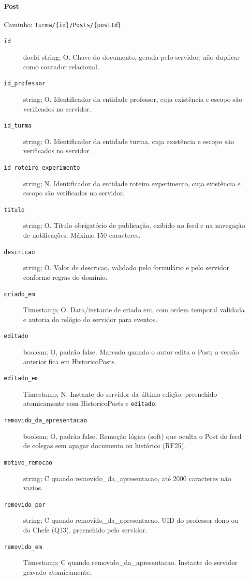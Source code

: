 \paragraph{Post}\mbox{}\par
Caminho: \texttt{Turma/\{id\}/Posts/\{postId\}}.
\begin{description}
\item[\texttt{id}] docId string; O. Chave do documento, gerada pelo servidor; não duplicar como contador relacional.
\item[\texttt{id\_professor}] string; O. Identificador da entidade professor, cuja existência e escopo são verificados no servidor.
\item[\texttt{id\_turma}] string; O. Identificador da entidade turma, cuja existência e escopo são verificados no servidor.
\item[\texttt{id\_roteiro\_experimento}] string; N. Identificador da entidade roteiro experimento, cuja existência e escopo são verificados no servidor.
\item[\texttt{titulo}] string; O. Título obrigatório de publicação, exibido no feed e na navegação de notificações. Máximo 150 caracteres.
\item[\texttt{descricao}] string; O. Valor de descricao, validado pelo formulário e pelo servidor conforme regras do domínio.
\item[\texttt{criado\_em}] Timestamp; O. Data/instante de criado em, com ordem temporal validada e autoria do relógio do servidor para eventos.
\item[\texttt{editado}] boolean; O, padrão false. Marcado quando o autor edita o Post; a versão anterior fica em HistoricoPosts.
\item[\texttt{editado\_em}] Timestamp; N. Instante do servidor da última edição; preenchido atomicamente com HistoricoPosts e \texttt{editado}.
\item[\texttt{removido\_da\_apresentacao}] boolean; O, padrão false. Remoção lógica (soft) que oculta o Post do feed de colegas sem apagar documento ou histórico (RF25).
\item[\texttt{motivo\_remocao}] string; C quando removido\_da\_apresentacao, até 2000 caracteres não vazios.
\item[\texttt{removido\_por}] string; C quando removido\_da\_apresentacao. UID do professor dono ou do Chefe (Q13), preenchido pelo servidor.
\item[\texttt{removido\_em}] Timestamp; C quando removido\_da\_apresentacao. Instante do servidor gravado atomicamente.

\end{description}
